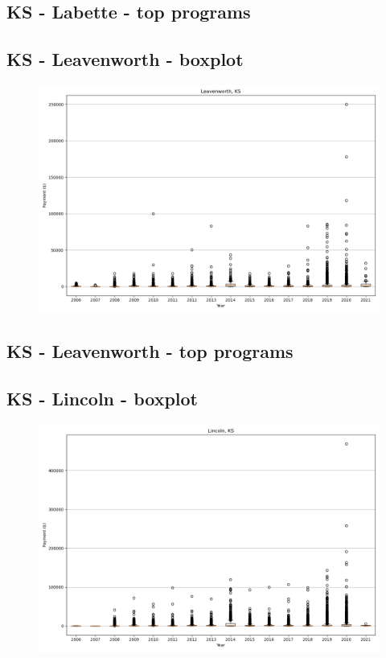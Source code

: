 \subsection*{KS - Labette - top programs}

\newpage
\subsection*{KS - Leavenworth - boxplot}
\begin{figure}[h]
\centering
\includegraphics[width=7in]{../output/boxplots/counties/Leavenworth-KS_boxplot.png}
\end{figure}


\subsection*{KS - Leavenworth - top programs}

\newpage
\subsection*{KS - Lincoln - boxplot}
\begin{figure}[h]
\centering
\includegraphics[width=7in]{../output/boxplots/counties/Lincoln-KS_boxplot.png}
\end{figure}


